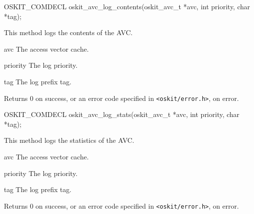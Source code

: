 \begin{apisyn}

	\funcproto OSKIT_COMDECL
	oskit_avc_log_contents(oskit_avc_t *avc, 
				int priority,
				char *tag);
\end{apisyn}
\begin{apidesc}
	This method logs the contents of the AVC.
\end{apidesc}
\begin{apiparm}
	\item[avc]
		The access vector cache.
	\item[priority]
		The log priority.
	\item[tag]
		The log prefix tag.
\end{apiparm}
\begin{apiret}
	Returns 0 on success, or an error code specified in
	{\tt <oskit/error.h>}, on error.
\end{apiret}


\begin{apisyn}

	\funcproto OSKIT_COMDECL
	oskit_avc_log_stats(oskit_avc_t *avc, 
				int priority,
				char *tag);
\end{apisyn}
\begin{apidesc}
	This method logs the statistics of the AVC.
\end{apidesc}
\begin{apiparm}
	\item[avc]
		The access vector cache.
	\item[priority]
		The log priority.
	\item[tag]
		The log prefix tag.
\end{apiparm}
\begin{apiret}
	Returns 0 on success, or an error code specified in
	{\tt <oskit/error.h>}, on error.
\end{apiret}


\label{oskit-avc-ss}

